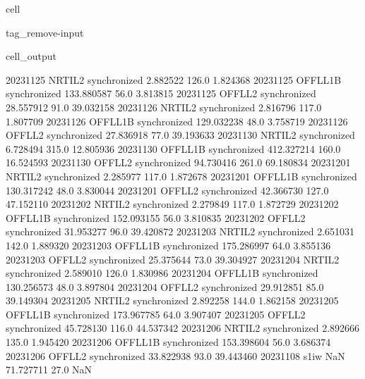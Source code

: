 \documentclass[letterpaper,10pt,english]{jupyterBook}
\begin{document}
\begin{sphinxuseclass}{cell}
\begin{sphinxuseclass}{tag_remove-input}
\begin{sphinxVerbatimOutput}
\begin{sphinxuseclass}{cell_output}
\begin{sphinxVerbatim}[commandchars=\\\{\}]
2023\PYGZhy{}11\PYGZhy{}25      NRTI\PYGZus{}L2  synchronized    2.882522   126.0    1.824368
2023\PYGZhy{}11\PYGZhy{}25     OFFL\PYGZus{}L1B  synchronized  133.880587    56.0    3.813815
2023\PYGZhy{}11\PYGZhy{}25      OFFL\PYGZus{}L2  synchronized   28.557912    91.0   39.032158
2023\PYGZhy{}11\PYGZhy{}26      NRTI\PYGZus{}L2  synchronized    2.816796   117.0    1.807709
2023\PYGZhy{}11\PYGZhy{}26     OFFL\PYGZus{}L1B  synchronized  129.032238    48.0    3.758719
2023\PYGZhy{}11\PYGZhy{}26      OFFL\PYGZus{}L2  synchronized   27.836918    77.0   39.193633
2023\PYGZhy{}11\PYGZhy{}30      NRTI\PYGZus{}L2  synchronized    6.728494   315.0   12.805936
2023\PYGZhy{}11\PYGZhy{}30     OFFL\PYGZus{}L1B  synchronized  412.327214   160.0   16.524593
2023\PYGZhy{}11\PYGZhy{}30      OFFL\PYGZus{}L2  synchronized   94.730416   261.0   69.180834
2023\PYGZhy{}12\PYGZhy{}01      NRTI\PYGZus{}L2  synchronized    2.285977   117.0    1.872678
2023\PYGZhy{}12\PYGZhy{}01     OFFL\PYGZus{}L1B  synchronized  130.317242    48.0    3.830044
2023\PYGZhy{}12\PYGZhy{}01      OFFL\PYGZus{}L2  synchronized   42.366730   127.0   47.152110
2023\PYGZhy{}12\PYGZhy{}02      NRTI\PYGZus{}L2  synchronized    2.279849   117.0    1.872729
2023\PYGZhy{}12\PYGZhy{}02     OFFL\PYGZus{}L1B  synchronized  152.093155    56.0    3.810835
2023\PYGZhy{}12\PYGZhy{}02      OFFL\PYGZus{}L2  synchronized   31.953277    96.0   39.420872
2023\PYGZhy{}12\PYGZhy{}03      NRTI\PYGZus{}L2  synchronized    2.651031   142.0    1.889320
2023\PYGZhy{}12\PYGZhy{}03     OFFL\PYGZus{}L1B  synchronized  175.286997    64.0    3.855136
2023\PYGZhy{}12\PYGZhy{}03      OFFL\PYGZus{}L2  synchronized   25.375644    73.0   39.304927
2023\PYGZhy{}12\PYGZhy{}04      NRTI\PYGZus{}L2  synchronized    2.589010   126.0    1.830986
2023\PYGZhy{}12\PYGZhy{}04     OFFL\PYGZus{}L1B  synchronized  130.256573    48.0    3.897804
2023\PYGZhy{}12\PYGZhy{}04      OFFL\PYGZus{}L2  synchronized   29.912851    85.0   39.149304
2023\PYGZhy{}12\PYGZhy{}05      NRTI\PYGZus{}L2  synchronized    2.892258   144.0    1.862158
2023\PYGZhy{}12\PYGZhy{}05     OFFL\PYGZus{}L1B  synchronized  173.967785    64.0    3.907407
2023\PYGZhy{}12\PYGZhy{}05      OFFL\PYGZus{}L2  synchronized   45.728130   116.0   44.537342
2023\PYGZhy{}12\PYGZhy{}06      NRTI\PYGZus{}L2  synchronized    2.892666   135.0    1.945420
2023\PYGZhy{}12\PYGZhy{}06     OFFL\PYGZus{}L1B  synchronized  153.398604    56.0    3.686374
2023\PYGZhy{}12\PYGZhy{}06      OFFL\PYGZus{}L2  synchronized   33.822938    93.0   39.443460
2023\PYGZhy{}11\PYGZhy{}08        s1\PYGZus{}iw           NaN   71.727711    27.0         NaN

\end{sphinxVerbatim}
\end{sphinxuseclass}
\end{sphinxVerbatimOutput}
\end{sphinxuseclass}
\end{sphinxuseclass}
\end{document}

